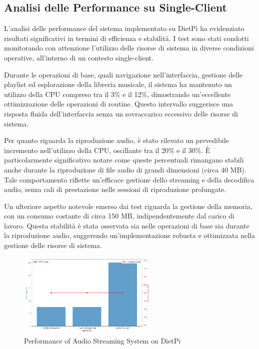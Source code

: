 \subsection{Analisi delle Performance su Single-Client}

L'analisi delle performance del sistema implementato su DietPi ha evidenziato risultati significativi in termini di efficienza e stabilità. I test sono stati condotti monitorando con attenzione l’utilizzo delle risorse di sistema in diverse condizioni operative, all'interno di un contesto single-client.

Durante le operazioni di base, quali navigazione nell’interfaccia, gestione delle playlist ed esplorazione della libreria musicale, il sistema ha mantenuto un utilizzo della CPU compreso tra il 3\% e il 12\%, dimostrando un’eccellente ottimizzazione delle operazioni di routine. Questo intervallo suggerisce una risposta fluida dell’interfaccia senza un sovraccarico eccessivo delle risorse di sistema.

Per quanto riguarda la riproduzione audio, è stato rilevato un prevedibile incremento nell’utilizzo della CPU, oscillante tra il 20\% e il 30\%. È particolarmente significativo notare come queste percentuali rimangano stabili anche durante la riproduzione di file audio di grandi dimensioni (circa 40 MB). Tale comportamento riflette un’efficace gestione dello streaming e della decodifica audio, senza cali di prestazione nelle sessioni di riproduzione prolungate.

Un ulteriore aspetto notevole emerso dai test riguarda la gestione della memoria, con un consumo costante di circa 150 MB, indipendentemente dal carico di lavoro. Questa stabilità è stata osservata sia nelle operazioni di base sia durante la riproduzione audio, suggerendo un’implementazione robusta e ottimizzata nella gestione delle risorse di sistema.

\begin{figure}[H]
  \centering
  \includegraphics[width=0.6\textwidth]{Chapters/Figures/performance_single_client.png}
  \caption{\small Performance of Audio Streaming System on DietPi} 
  \label{fig:performance_single_client}
\end{figure}
